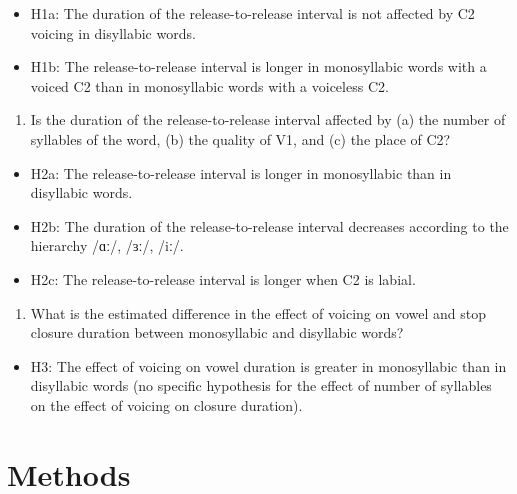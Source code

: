 \documentclass[12pt,a4paper,]{article}
\providecommand{\tightlist}{%
  \setlength{\itemsep}{0pt}\setlength{\parskip}{0pt}}
\begin{document}
\begin{itemize}
\tightlist
\item
  H1a: The duration of the release-to-release interval is not affected
  by C2 voicing in disyllabic words.
\item
  H1b: The release-to-release interval is longer in monosyllabic words
  with a voiced C2 than in monosyllabic words with a voiceless C2.
\end{itemize}

\begin{enumerate}
\def\labelenumi{\arabic{enumi}.}
\setcounter{enumi}{1}
\tightlist
\item
  Is the duration of the release-to-release interval affected by (a) the
  number of syllables of the word, (b) the quality of V1, and (c) the
  place of C2?
\end{enumerate}

\begin{itemize}
\tightlist
\item
  H2a: The release-to-release interval is longer in monosyllabic than in
  disyllabic words.
\item
  H2b: The duration of the release-to-release interval decreases
  according to the hierarchy /ɑː/, /ɜː/, /iː/.
\item
  H2c: The release-to-release interval is longer when C2 is labial.
\end{itemize}

\begin{enumerate}
\def\labelenumi{\arabic{enumi}.}
\setcounter{enumi}{2}
\tightlist
\item
  What is the estimated difference in the effect of voicing on vowel and
  stop closure duration between monosyllabic and disyllabic words?
\end{enumerate}

\begin{itemize}
\tightlist
\item
  H3: The effect of voicing on vowel duration is greater in monosyllabic
  than in disyllabic words (no specific hypothesis for the effect of
  number of syllables on the effect of voicing on closure duration).
\end{itemize}

\hypertarget{methods}{%
\section{Methods}\label{methods}}
\end{document}
